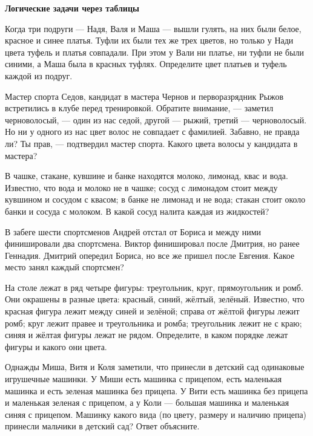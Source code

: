 \centerline{\bf \Huge Логические задачи через таблицы}

 Когда три подруги  — Надя, Валя и Маша  — вышли гулять, на них были белое, красное и синее платья. Туфли их были тех же трех цветов, но только у Нади цвета туфель и платья совпадали. При этом у Вали ни платье, ни туфли не были синими, а Маша была в красных туфлях. Определите цвет платьев и туфель каждой из подруг.

 Мастер спорта Седов, кандидат в мастера Чернов и перворазрядник Рыжов встретились в клубе перед тренировкой. Обратите внимание,  — заметил черноволосый,  — один из нас седой, другой  — рыжий, третий  — черноволосый. Но ни у одного из нас цвет волос не совпадает с фамилией. Забавно, не правда ли? Ты прав,  — подтвердил мастер спорта. Какого цвета волосы у кандидата в мастера?

 В чашке, стакане, кувшине и банке находятся молоко, лимонад, квас и вода. Известно, что вода и молоко не в чашке; сосуд с лимонадом стоит между кувшином и сосудом с квасом; в банке не лимонад и не вода; стакан стоит около банки и сосуда с молоком. В какой сосуд налита каждая из жидкостей?

 В забеге шести спортсменов Андрей отстал от Бориса и между ними финишировали два спортсмена. Виктор финишировал после Дмитрия, но ранее Геннадия. Дмитрий опередил Бориса, но все же пришел после Евгения. Какое место занял каждый спортсмен?

 На столе лежат в ряд четыре фигуры: треугольник, круг, прямоугольник и ромб. Они окрашены в разные цвета: красный, синий, жёлтый, зелёный. Известно, что красная фигура лежит между синей и зелёной; справа от жёлтой фигуры лежит ромб; круг лежит правее и треугольника и ромба; треугольник лежит не с краю; синяя и жёлтая фигуры лежат не рядом. Определите, в каком порядке лежат фигуры и какого они цвета.

 Однажды Миша, Витя и Коля заметили, что принесли в детский сад одинаковые игрушечные машинки. У Миши есть машинка с прицепом, есть маленькая машинка и есть зеленая машинка без прицепа. У Вити есть машинка без прицепа и маленькая зеленая с прицепом, а у Коли — большая машинка и маленькая синяя с прицепом. Машинку какого вида (по цвету, размеру и наличию прицепа) принесли мальчики в детский сад? Ответ объясните.


